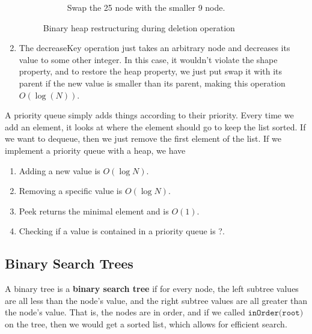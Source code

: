 \begin{enumerate}
\begin{figure}[H]
\begin{subfigure}[b]{0.48\textwidth}
        \caption{Swap the 25 node with the smaller 9 node.}
        \label{fig:remove-heap-step3}
      \end{subfigure}

      \caption{Binary heap restructuring during deletion operation}
      \label{fig:remove-heap}
    \end{figure}
    
    \item The decreaseKey operation just takes an arbitrary node and decreases its value to some other integer. In this case, it wouldn't violate the shape property, and to restore the heap property, we just put swap it with its parent if the new value is smaller than its parent, making this operation $O(\log(N))$. 
  \end{enumerate}

  \begin{definition}
    A priority queue simply adds things according to their priority. Every time we add an element, it looks at where the element should go to keep the list sorted. If we want to dequeue, then we just remove the first element of the list. If we implement a priority queue with a heap, we have
    \begin{enumerate}
      \item Adding a new value is $O(\log N)$. 
      \item Removing a specific value is $O(\log N)$. 
      \item Peek returns the minimal element and is $O(1)$. 
      \item Checking if a value is contained in a priority queue is ?. 
    \end{enumerate}
  \end{definition}

\subsection{Binary Search Trees}

  \begin{definition}
    A binary tree is a \textbf{binary search tree} if for every node, the left subtree values are all less than the node's value, and the right subtree values are all greater than the node's value. That is, the nodes are in order, and if we called $\texttt{inOrder(root)}$ on the tree, then we would get a sorted list, which allows for efficient search. 
  \end{definition}

